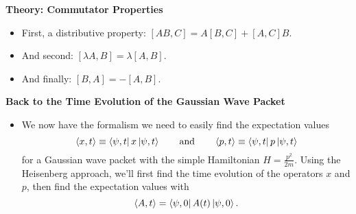 \documentclass[11pt, a4paper]{article}
\newcommand{\eqtext}[1]{\qquad \text{#1} \qquad}
\begin{document}
\textbf{Theory: Commutator Properties}
\begin{itemize}
	\item First, a distributive property: $ [AB, C] = A[B, C] + [A, C]B $.
	
	\item And second: $ [\lambda A, B] = \lambda [A, B] $.
	
	\item And  finally: $ [B, A] = -[A, B] $.
\end{itemize}

\textbf{Back to the Time Evolution of the Gaussian Wave Packet}
\begin{itemize}
	\item We now have the formalism we need to easily find the expectation values
	\begin{equation*}
		\ev{x, t} \equiv \bra{\psi, t}x\ket{\psi, t} \eqtext{and} \ev{p, t} \equiv \bra{\psi, t}p\ket{\psi, t}
	\end{equation*}
	for a Gaussian wave packet with the simple Hamiltonian $ H = \frac{p^{2}}{2m} $. Using the Heisenberg approach, we'll first find the time evolution of the operators $ x $ and $ p $, then find the expectation values with
	\begin{equation*}
		\ev{A, t} = \bra{\psi, 0} A(t) \ket{\psi, 0}.
	\end{equation*}
	

\end{itemize}
\end{document}

